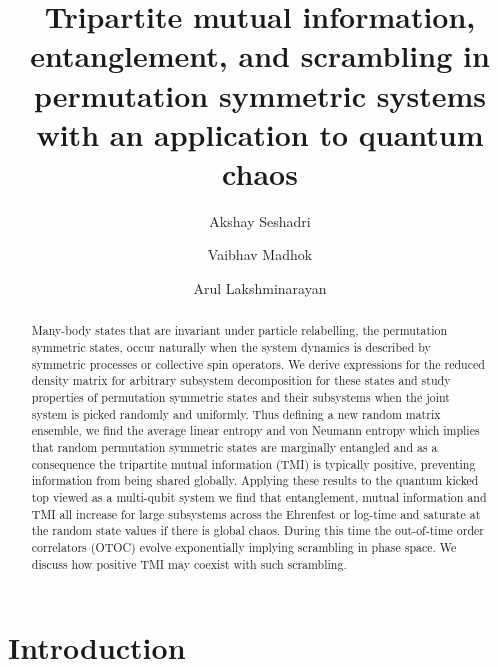 \documentclass[pre,aps,showpacs,showkeys,twocolumn]{revtex4-1}
\theoremstyle{definition}
\theoremstyle{remark}
\begin{document}
\title{Tripartite mutual information, entanglement, and scrambling in permutation symmetric systems with an application to quantum chaos}

\author{Akshay Seshadri}
\author{Vaibhav Madhok}
\author{Arul Lakshminarayan}
\date{}

\begin{abstract}

Many-body states that are invariant under particle relabelling, the permutation symmetric states, occur naturally when the system dynamics is described by symmetric processes or collective spin operators. We derive expressions for the reduced density matrix for arbitrary subsystem decomposition for these states and study properties of permutation symmetric states and their subsystems when the joint system is picked randomly and uniformly. Thus defining a new random matrix ensemble, we find the average linear entropy and von Neumann entropy which implies that random permutation symmetric states are marginally entangled and as a consequence the tripartite mutual information (TMI) is typically positive, preventing information from being shared globally. Applying these results to the quantum kicked top viewed as a multi-qubit system we find that entanglement, mutual information and TMI all increase for large subsystems across the Ehrenfest or log-time and saturate at the random state values if there is global chaos. During this time the out-of-time order correlators (OTOC) evolve exponentially implying scrambling in phase space. We discuss how positive TMI may coexist with such scrambling.

\end{abstract}

\maketitle

\section{Introduction}
\end{document}
